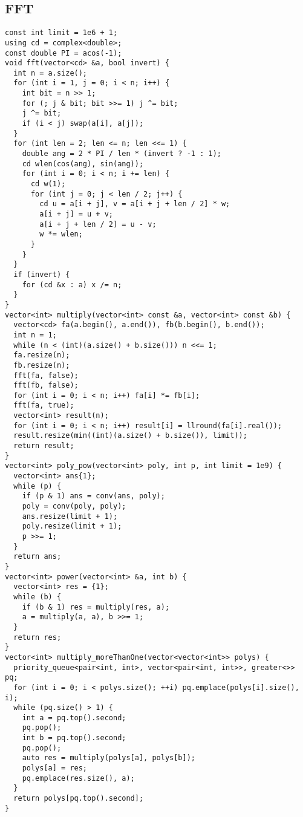 \documentclass[twoside]{article}
\begin{document}
\begin{multicols*}{2}
{\subsection*{FFT}
}
\begin{verbatim}
const int limit = 1e6 + 1;
using cd = complex<double>;
const double PI = acos(-1);
void fft(vector<cd> &a, bool invert) {
  int n = a.size();
  for (int i = 1, j = 0; i < n; i++) {
    int bit = n >> 1;
    for (; j & bit; bit >>= 1) j ^= bit;
    j ^= bit;
    if (i < j) swap(a[i], a[j]);
  }
  for (int len = 2; len <= n; len <<= 1) {
    double ang = 2 * PI / len * (invert ? -1 : 1);
    cd wlen(cos(ang), sin(ang));
    for (int i = 0; i < n; i += len) {
      cd w(1);
      for (int j = 0; j < len / 2; j++) {
        cd u = a[i + j], v = a[i + j + len / 2] * w;
        a[i + j] = u + v;
        a[i + j + len / 2] = u - v;
        w *= wlen;
      }
    }
  }
  if (invert) {
    for (cd &x : a) x /= n;
  }
}
vector<int> multiply(vector<int> const &a, vector<int> const &b) {
  vector<cd> fa(a.begin(), a.end()), fb(b.begin(), b.end());
  int n = 1;
  while (n < (int)(a.size() + b.size())) n <<= 1;
  fa.resize(n);
  fb.resize(n);
  fft(fa, false);
  fft(fb, false);
  for (int i = 0; i < n; i++) fa[i] *= fb[i];
  fft(fa, true);
  vector<int> result(n);
  for (int i = 0; i < n; i++) result[i] = llround(fa[i].real());
  result.resize(min((int)(a.size() + b.size()), limit));
  return result;
}
vector<int> poly_pow(vector<int> poly, int p, int limit = 1e9) {
  vector<int> ans{1};
  while (p) {
    if (p & 1) ans = conv(ans, poly);
    poly = conv(poly, poly);
    ans.resize(limit + 1);
    poly.resize(limit + 1);
    p >>= 1;
  }
  return ans;
}
vector<int> power(vector<int> &a, int b) {
  vector<int> res = {1};
  while (b) {
    if (b & 1) res = multiply(res, a);
    a = multiply(a, a), b >>= 1;
  }
  return res;
}
vector<int> multiply_moreThanOne(vector<vector<int>> polys) {
  priority_queue<pair<int, int>, vector<pair<int, int>>, greater<>> pq;
  for (int i = 0; i < polys.size(); ++i) pq.emplace(polys[i].size(), i);
  while (pq.size() > 1) {
    int a = pq.top().second;
    pq.pop();
    int b = pq.top().second;
    pq.pop();
    auto res = multiply(polys[a], polys[b]);
    polys[a] = res;
    pq.emplace(res.size(), a);
  }
  return polys[pq.top().second];
}
\end{verbatim}

{
}
\end{multicols*}
\end{document}
